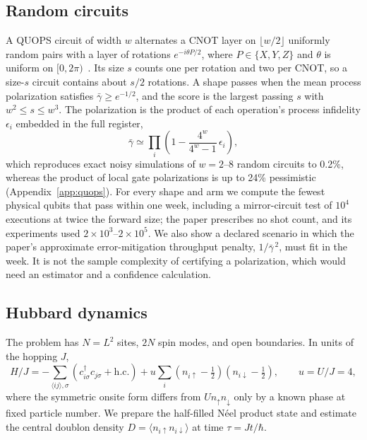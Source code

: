 \documentclass[11pt]{article}
\begin{document}
\subsection{Random circuits}\label{sec:quops}
A QUOPS circuit of width $w$ alternates a CNOT layer on $\lfloor w/2\rfloor$
uniformly random pairs with a layer of rotations $e^{-i\theta P/2}$, where
$P\in\{X,Y,Z\}$ and $\theta$ is uniform on $[0,2\pi)$~\cite{proctor2026quops}.
Its size $s$ counts one per rotation and two per CNOT, so a size-$s$ circuit
contains about $s/2$ rotations. A shape passes when the mean process
polarization satisfies $\bar\gamma\geq e^{-1/2}$, and the score is the largest
passing $s$ with $w^2\leq s\leq w^3$. The polarization is the product of each
operation's process infidelity $\epsilon_i$ embedded in the full register,
\begin{equation}\label{eq:quops-polarization}
 \bar\gamma\simeq\prod_i\left(1-\frac{4^w}{4^w-1}\,\epsilon_i\right),
\end{equation}
which reproduces exact noisy simulations of $w=2$--8 random circuits to 0.2\%,
whereas the product of local gate polarizations is up to 24\% pessimistic
(Appendix~\ref{app:quops}). For every shape and arm we compute the fewest
physical qubits that pass within one week, including a mirror-circuit test of
$10^4$ executions at twice the forward size; the paper prescribes no shot
count, and its experiments used $2\times10^3$--$2\times10^5$. We also show a
declared scenario in which the paper's approximate error-mitigation throughput
penalty, $1/\bar\gamma^{\,2}$, must fit in the week. It is not the sample
complexity of certifying a polarization, which would need an estimator and a
confidence calculation.

\subsection{Hubbard dynamics}
The problem has $N=L^2$ sites, $2N$ spin modes, and open boundaries. In
units of the hopping $J$,
\begin{equation}\label{eq:H}
 H/J=-\sum_{\langle ij\rangle,\sigma}
 (c^\dagger_{i\sigma}c_{j\sigma}+\mathrm{h.c.})
 +u\sum_i(n_{i\uparrow}-\tfrac12)(n_{i\downarrow}-\tfrac12),
 \qquad u=U/J=4,
\end{equation}
where the symmetric onsite form differs from $Un_\uparrow n_\downarrow$ only
by a known phase at fixed particle number. We prepare the half-filled N\'eel
product state and estimate the central doublon density
$D=\langle n_{i\uparrow}n_{i\downarrow}\rangle$ at time $\tau=Jt/\hbar$.
\end{document}
